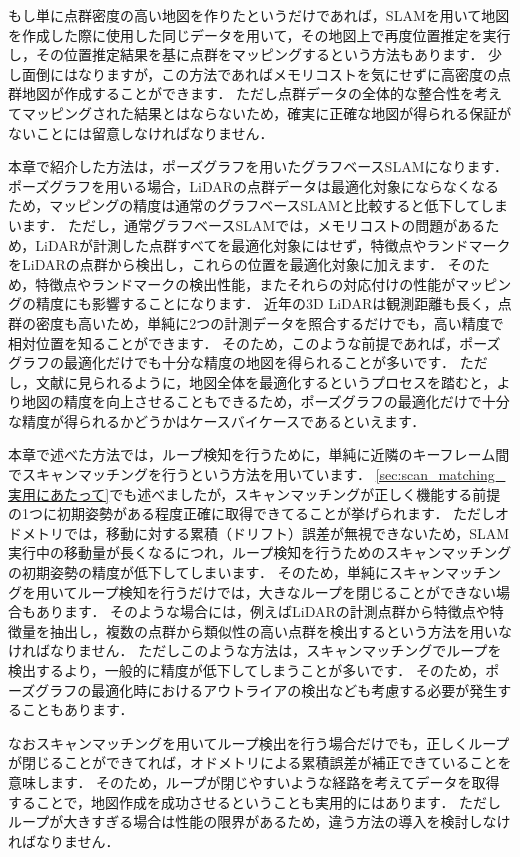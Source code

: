 もし単に点群密度の高い地図を作りたというだけであれば，SLAMを用いて地図を作成した際に使用した同じデータを用いて，その地図上で再度位置推定を実行し，その位置推定結果を基に点群をマッピングするという方法もあります．
少し面倒にはなりますが，この方法であればメモリコストを気にせずに高密度の点群地図が作成することができます．
ただし点群データの全体的な整合性を考えてマッピングされた結果とはならないため，確実に正確な地図が得られる保証がないことには留意しなければなりません．

本章で紹介した方法は，ポーズグラフを用いたグラフベースSLAMになります．
ポーズグラフを用いる場合，LiDARの点群データは最適化対象にならなくなるため，マッピングの精度は通常のグラフベースSLAMと比較すると低下してしまいます．
ただし，通常グラフベースSLAMでは，メモリコストの問題があるため，LiDARが計測した点群すべてを最適化対象にはせず，特徴点やランドマークをLiDARの点群から検出し，これらの位置を最適化対象に加えます．
そのため，特徴点やランドマークの検出性能，またそれらの対応付けの性能がマッピングの精度にも影響することになります．
近年の3D LiDARは観測距離も長く，点群の密度も高いため，単純に2つの計測データを照合するだけでも，高い精度で相対位置を知ることができます．
そのため，このような前提であれば，ポーズグラフの最適化だけでも十分な精度の地図を得られることが多いです．
ただし，文献\cite{KoideRAS2024}に見られるように，地図全体を最適化するというプロセスを踏むと，より地図の精度を向上させることもできるため，ポーズグラフの最適化だけで十分な精度が得られるかどうかはケースバイケースであるといえます．

本章で述べた方法では，ループ検知を行うために，単純に近隣のキーフレーム間でスキャンマッチングを行うという方法を用いています．
\ref{sec:scan_matching_実用にあたって}でも述べましたが，スキャンマッチングが正しく機能する前提の1つに初期姿勢がある程度正確に取得できてることが挙げられます．
ただしオドメトリでは，移動に対する累積（ドリフト）誤差が無視できないため，SLAM実行中の移動量が長くなるにつれ，ループ検知を行うためのスキャンマッチングの初期姿勢の精度が低下してしまいます．
そのため，単純にスキャンマッチングを用いてループ検知を行うだけでは，大きなループを閉じることができない場合もあります．
そのような場合には，例えばLiDARの計測点群から特徴点や特徴量を抽出し，複数の点群から類似性の高い点群を検出するという方法を用いなければなりません．
ただしこのような方法は，スキャンマッチングでループを検出するより，一般的に精度が低下してしまうことが多いです．
そのため，ポーズグラフの最適化時におけるアウトライアの検出なども考慮する必要が発生することもあります．

なおスキャンマッチングを用いてループ検出を行う場合だけでも，正しくループが閉じることができてれば，オドメトリによる累積誤差が補正できていることを意味します．
そのため，ループが閉じやすいような経路を考えてデータを取得することで，地図作成を成功させるということも実用的にはあります．
ただしループが大きすぎる場合は性能の限界があるため，違う方法の導入を検討しなければなりません．





